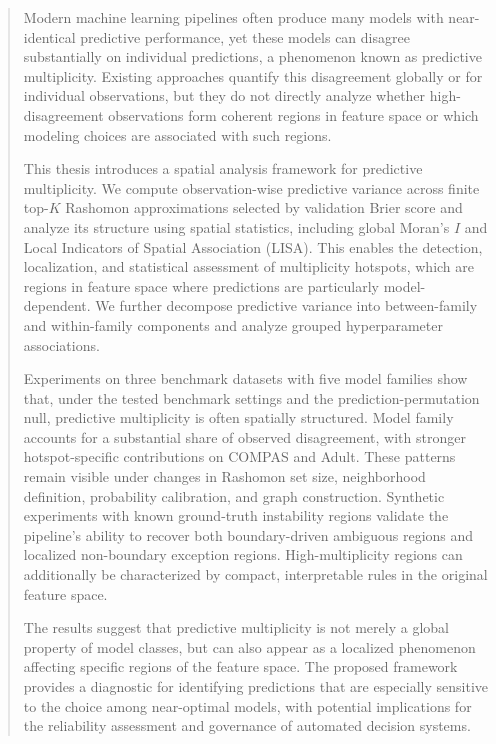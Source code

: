\documentclass[12pt]{article}
\begin{document}
\begin{abstract}
    
Modern machine learning pipelines often produce many models with near\hyp{}identical
predictive performance, yet these models can disagree substantially on individual
predictions, a phenomenon known as predictive multiplicity. Existing approaches quantify this disagreement globally or for individual observations,
but they do not directly analyze whether high-disagreement observations form coherent
regions in feature space or which modeling choices are associated with such regions.

This thesis introduces a spatial analysis framework for predictive multiplicity. We
compute observation-wise predictive variance across finite top-$K$ Rashomon
approximations selected by validation Brier score and analyze its structure using
spatial statistics, including global Moran's $I$ and Local Indicators of Spatial
Association (LISA). This enables the detection, localization, and statistical assessment of multiplicity hotspots, which are regions in feature space where predictions are particularly model-dependent. We further decompose predictive variance into between-family and within-family components
and analyze grouped hyperparameter associations.

Experiments on three benchmark datasets with five model families show that, under the
tested benchmark settings and the prediction-permutation null, predictive multiplicity is
often spatially structured. Model family accounts for a substantial share of observed
disagreement, with stronger hotspot-specific contributions on COMPAS and Adult. These
patterns remain visible under changes in Rashomon set size, neighborhood definition,
probability calibration, and graph construction. Synthetic experiments with known ground-truth instability regions validate the pipeline's ability
to recover both boundary-driven ambiguous regions and localized non-boundary exception regions.
High-multiplicity regions can additionally be characterized by compact, interpretable
rules in the original feature space.

The results suggest that predictive multiplicity is not merely a global property of model
classes, but can also appear as a localized phenomenon affecting specific regions of the
feature space. The proposed framework provides a diagnostic for identifying predictions
that are especially sensitive to the choice among near-optimal models, with potential implications for the reliability assessment and governance of automated
decision systems.
\end{abstract}
\end{document}
